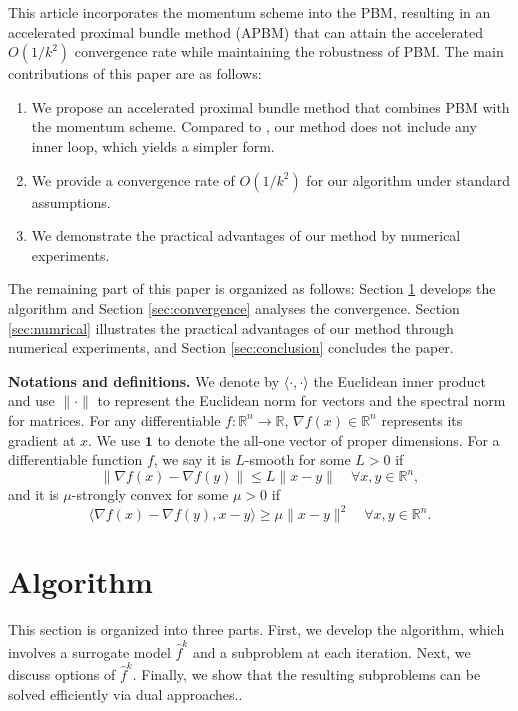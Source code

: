 \documentclass[letterpaper, 10 pt, conference]{ieeeconf}  %
\newcommand{\mb}{\mathbf}
\begin{document}
This article incorporates the momentum scheme into the PBM, resulting in an accelerated proximal bundle method (APBM) that can attain the accelerated $O(1/k^2)$ convergence rate while maintaining the robustness of PBM. The main contributions of this paper are as follows:
\begin{enumerate}[label=\arabic*)]
    \item We propose an accelerated proximal bundle method that combines PBM with the momentum scheme. Compared to \cite{liao2025accelerated,fersztand2025acceleration}, our method does not include any inner loop, which yields a simpler form.
    \item We provide a convergence rate of $O(1/k^2)$ for our algorithm under standard assumptions.
    \item We demonstrate the practical advantages of our method by numerical experiments. 
\end{enumerate}



The remaining part of this paper is organized as follows: Section \ref{sec:algorithms} develops the algorithm and Section \ref{sec:convergence} analyses the convergence. Section \ref{sec:numrical} illustrates the practical advantages of our method through numerical experiments, and Section \ref{sec:conclusion} concludes the paper.


\textbf{Notations and definitions.} We denote by $\langle \cdot,\cdot \rangle$ the Euclidean inner product and use $\|\cdot\|$ to represent the Euclidean norm for vectors and the spectral norm for matrices. For any differentiable $f:\mathbb{R}^n \rightarrow \mathbb{R}$, $\nabla  f(x) \in \mathbb{R}^n$ represents its gradient at $x$. We use $\mb{1}$ to denote the all-one vector of proper dimensions. For a differentiable function $f$, we say it is $L$-smooth for some $L>0$ if
\[\|\nabla f(x)-\nabla f(y)\| \leq L\|x-y\|\quad \forall x,y \in \mathbb{R}^n,\]
and it is $\mu$-strongly convex for some $\mu>0$ if 
\[\langle \nabla f(x) - \nabla f(y), x-y\rangle \geq \mu \|x-y\|^2\quad \forall x,y \in \mathbb{R}^n.\] 

\section{Algorithm}\label{sec:algorithms}
This section is organized into three parts. First, we develop the algorithm, which involves a surrogate model $\hat{f}^k$ and a subproblem at each iteration. Next, we discuss options of $\hat{f}^k$. Finally, we show that the resulting subproblems can be solved efficiently via dual approaches..
\end{document}
